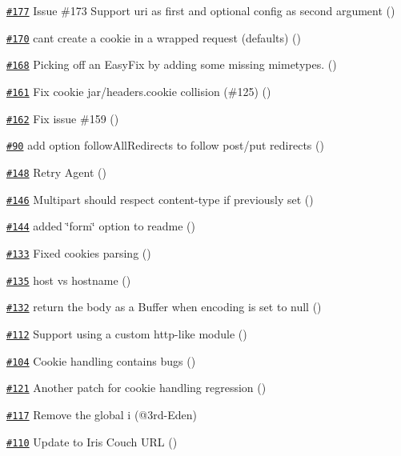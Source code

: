 \begin{DoxyItemize}
\item \href{https://github.com/request/request/pull/177}{\tt \#177} Issue \#173 Support uri as first and optional config as second argument ()
\item \href{https://github.com/request/request/pull/170}{\tt \#170} can\textquotesingle{}t create a cookie in a wrapped request (defaults) ()
\item \href{https://github.com/request/request/pull/168}{\tt \#168} Picking off an Easy\+Fix by adding some missing mimetypes. ()
\item \href{https://github.com/request/request/pull/161}{\tt \#161} Fix cookie jar/headers.\+cookie collision (\#125) ()
\item \href{https://github.com/request/request/pull/162}{\tt \#162} Fix issue \#159 ()
\item \href{https://github.com/request/request/pull/90}{\tt \#90} add option follow\+All\+Redirects to follow post/put redirects ()
\item \href{https://github.com/request/request/pull/148}{\tt \#148} Retry Agent ()
\item \href{https://github.com/request/request/pull/146}{\tt \#146} Multipart should respect content-\/type if previously set ()
\item \href{https://github.com/request/request/pull/144}{\tt \#144} added \char`\"{}form\char`\"{} option to readme ()
\item \href{https://github.com/request/request/pull/133}{\tt \#133} Fixed cookies parsing ()
\item \href{https://github.com/request/request/pull/135}{\tt \#135} host vs hostname ()
\item \href{https://github.com/request/request/pull/132}{\tt \#132} return the body as a Buffer when encoding is set to null ()
\item \href{https://github.com/request/request/pull/112}{\tt \#112} Support using a custom http-\/like module ()
\item \href{https://github.com/request/request/pull/104}{\tt \#104} Cookie handling contains bugs ()
\item \href{https://github.com/request/request/pull/121}{\tt \#121} Another patch for cookie handling regression ()
\item \href{https://github.com/request/request/pull/117}{\tt \#117} Remove the global {\ttfamily i} (@3rd-\/\+Eden)
\item \href{https://github.com/request/request/pull/110}{\tt \#110} Update to Iris Couch U\+RL ()

\end{DoxyItemize}
